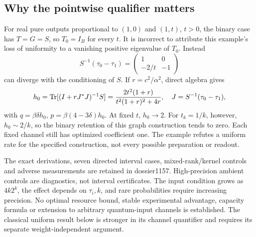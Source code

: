 \subsection{Why the pointwise qualifier matters}
For real pure outputs proportional to $(1,0)$ and $(1,t)$, $t>0$, the binary case has $T=G=S$, so $T_0=I_B$ for every $t$. It is incorrect to attribute this example's loss of uniformity to a vanishing positive eigenvalue of $T_0$. Instead
\[
 S^{-1}(\tau_0-\tau_1)=\begin{pmatrix}1&0\\-2/t&-1\end{pmatrix}
\]
can diverge with the conditioning of $S$. If $r=c^2/\alpha^2$, direct algebra gives
\[
 h_0=\operatorname{Tr}[(I+rJ^*J)^{-1}S]
   =\frac{2t^2(1+r)}{t^2(1+r)^2+4r},
 \quad J=S^{-1}(\tau_0-\tau_1),
\]
with $q=\beta\delta h_0$, $p=\beta(4-3\delta)h_0$. At fixed $t$, $h_0\to2$. For $t_k=1/k$, however, $h_0\sim2/k$, so the binary retention of this graph construction tends to zero. Each fixed channel still has optimized coefficient one. The example refutes a uniform rate for the specified construction, not every possible preparation or readout.

The exact derivations, seven directed interval cases, mixed-rank/kernel controls and adverse measurements are retained in dossier1157. High-precision ambient controls are diagnostics, not interval certificates. The input condition grows as $4k2^k$, the effect depends on $\tau_i,k$, and rare probabilities require increasing precision. No optimal resource bound, stable experimental advantage, capacity formula or extension to arbitrary quantum-input channels is established. The classical uniform result below is stronger in its channel quantifier and requires its separate weight-independent argument.
